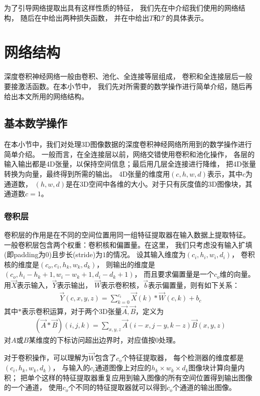 为了引导网络提取出具有这样性质的特征，
我们先在中介绍我们使用的网络结构，
随后在中给出两种损失函数，
并在中给出$T$和$\mathcal{T}$的具体表示。



\section{网络结构\label{sec:cnn:arch}}
深度卷积神经网络一般由卷积、池化、全连接等层组成，
卷积和全连接层后一般要接激活函数。在本小节中，
我们先对所需要的数学操作进行简单介绍，随后再给出本文所用的网络结构。

\subsection{基本数学操作}
在本小节中，我们对处理3D图像数据的深度卷积神经网络所用到的数学操作进行简单介绍。
一般而言，在全连接层以前，网络交错使用卷积和池化操作，
各层的输入输出都是4D张量，以保持空间信息；最后用几层全连接进行降维，
把4D张量转换为向量，最终得到所需的输出。
4D张量的维度用$(c, h, w, d)$表示，其中$c$为通道数，
$(h, w, d)$是在3D空间中各维的大小。对于只有灰度值的3D图像块，其通道数$c=1$。


\subsubsection{卷积层}
卷积层的作用是在不同的空间位置用同一组特征提取器在输入数据上提取特征。
一般卷积层包含两个权重：卷积核和偏置量。在这里，
我们只考虑没有输入扩填(即padding为0)且步长(stride)为$1$的情况。
设其输入维度为$(c_i, h_i, w_i, d_i)$，
卷积核的维度是$(c_o, c_i, h_k, w_k, d_k)$，
则输出的维度是$(c_o, h_i - h_k + 1, w_i - w_k + 1, d_i - d_k + 1)$，
而且要求偏置量是一个$c_o$维的向量。用$\vec{X}$表示输入，$\vec{Y}$表示输出，
$\vec{W}$表示卷积核，$\vec{b}$表示偏置量，则有如下关系：
\begin{eqnarray}
    \vec{Y}(c, x, y, z) = \sum_{k=0}^{c_i} \vec{X}(k) * \vec{W}(c, k) + b_c
\end{eqnarray}
其中$*$表示卷积运算，对于两个3D张量$\vec{A}, \vec{B}$，定义为
\begin{eqnarray}
    (\vec{A} * \vec{B})(i, j, k) = \sum_{x, y, z}\vec{A}(i-x, j-y, k-z)
        \vec{B}(x,y,z)
\end{eqnarray}
对$A$或$B$某维度的下标访问超出边界时，对应值按$0$处理。

对于卷积操作，可以理解为$\vec{W}$包含了$c_o$个特征提取器，
每个检测器的维度都是$(c_i, h_k, w_k, d_k)$，
与输入的$c_i$通道图像上对应的$h_k \times w_k \times d_k$图像块计算向量内积；
把单个这样的特征提取器重复应用到输入图像的所有空间位置得到输出图像的一个通道，
使用$c_o$个不同的特征提取器就可以得到$c_o$个通道的输出图像。


